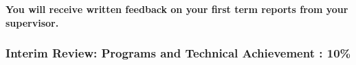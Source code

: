 \documentclass[11pt]{article}
\newcommand{\interimreportweight}{10\% }
\newcommand{\interimtechnicalweight}{10\% }
\begin{document}
\begin{tabular}{||l|c|p{10cm}|c||}
\hline
\hline
\end{tabular}


\textbf{You will receive written feedback on your first term reports from your supervisor.}

\newpage
\subsubsection{Interim Review: Programs and Technical Achievement : \interimtechnicalweight}
\end{document}
